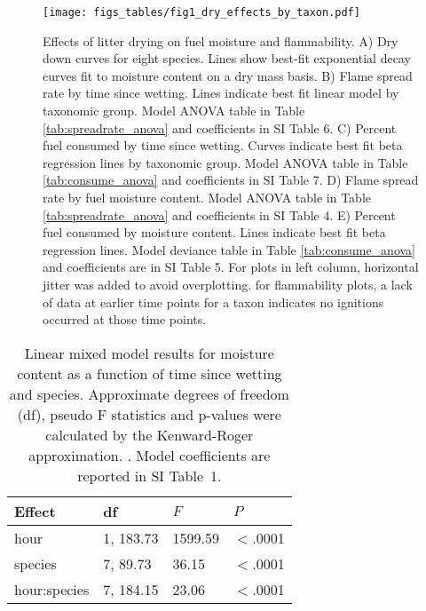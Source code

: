 \documentclass[letterpaper,12pt]{article}
\begin{document}
\begin{figure}
  \centering
  \texttt{[image: figs\_tables/fig1\_dry\_effects\_by\_taxon.pdf]}
  \caption{}
\end{figure}
\begin{figure}
  \captionsetup{labelformat=adja-page}
  \ContinuedFloat
  \caption{Effects of litter drying on fuel moisture and flammability. A) Dry
    down curves for eight species. Lines show best-fit exponential decay curves
    fit to moisture content on a dry mass basis. B) Flame spread rate by time
    since wetting. Lines indicate best fit linear model by taxonomic group.
    Model ANOVA table in Table \ref{tab:spreadrate_anova} and coefficients in
    SI Table 6. C) Percent fuel consumed by time since wetting. Curves indicate
    best fit beta regression lines by taxonomic group. Model ANOVA table in
    Table \ref{tab:consume_anova} and coefficients in SI Table 7. D) Flame
    spread rate by fuel moisture content. Model ANOVA table in Table
    \ref{tab:spreadrate_anova} and coefficients in SI Table 4. E) Percent fuel
    consumed by moisture content. Lines indicate best fit beta regression
    lines. Model deviance table in Table \ref{tab:consume_anova} and
    coefficients are in SI Table 5. For plots in left column, horizontal jitter
    was added to avoid overplotting. for flammability plots, a lack of data at
    earlier time points for a taxon indicates no ignitions occurred at those
    time points.}
 \label{fig:drydown}
\end{figure}


\begin{table}
  \caption{Linear mixed model results for moisture content as a function of
    time since wetting and species. Approximate degrees of freedom (df), pseudo F
    statistics and p-values were calculated by the Kenward-Roger approximation.
    \citep{Kenward_Roger-1997}. Model coefficients are reported in SI Table~1.
  \label{tab:drydown}}
\centering
\begin{tabular}{llll}
  \toprule
Effect & df & $F$ & $P$ \\ 
  \midrule
  hour & 1, 183.73 & 1599.59 & $<$.0001 \\ 
  species & 7, 89.73 & 36.15 & $<$.0001 \\ 
  hour:species & 7, 184.15 & 23.06 & $<$.0001 \\ 
   \bottomrule
\end{tabular}
\end{table}
\end{document}
